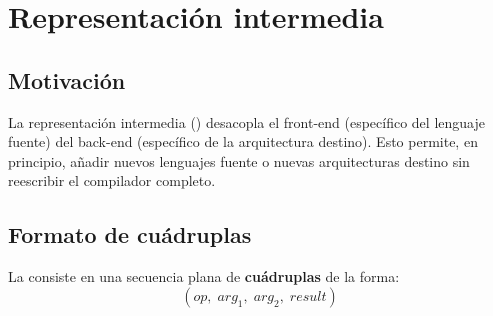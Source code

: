\chapter{Representación intermedia}
\label{chap:ir}

\section{Motivación}

La representación intermedia (\IR{}) desacopla el front-end
(específico del lenguaje fuente) del back-end (específico de la
arquitectura destino). Esto permite, en principio, añadir nuevos
lenguajes fuente o nuevas arquitecturas destino sin reescribir
el compilador completo.

\section{Formato de cuádruplas}

La \IR{} consiste en una secuencia plana de \textbf{cuádruplas} de la forma:
\[
  (op,\; \mathit{arg}_1,\; \mathit{arg}_2,\; \mathit{result})
\]

